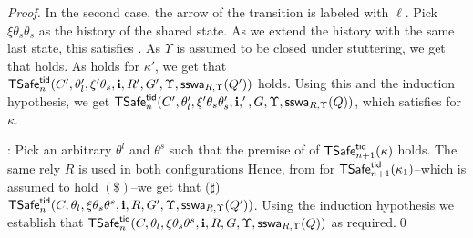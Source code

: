 \begin{proof}
In the second case, the arrow of the transition is labeled with $\ell$.
Pick $\xi\theta_s\theta_s$ as the history of the shared state.
As we extend the history with the same last state, this satisfies .
As $\Upsilon$ is assumed to be closed under stuttering, we get that
 holds.
As  holds for $\kappa'$, we get that 
$\safe_n(C',\theta'_l,\xi'\theta_s,\intp,R',G',\Upsilon,\sswa{Q'}{R}{\Upsilon})$ holds.
Using this and the induction hypothesis, we get
$\safe_n(C',\theta'_l,\xi'\theta_s\theta_s',\intp,',G,\Upsilon,\sswa{Q}{R}{\Upsilon})$,
which satisfies   for $\kappa$.


%

: 
Pick an arbitrary $\theta^l$ and $\theta^{s}$ such that the 
premise of  of $\safe_{n+1}(\kappa)$ holds. 
The same rely $R$ is used in both configurations 
Hence, %
from  for $\safe_{n+1}(\kappa_1)$--which is assumed to 
hold $(\$)$--we get that ($\sharp$)
$\safe_n(C,\theta_l,\xi\theta_s\theta^{s},\intp,R,G',\Upsilon, \sswa{Q'}{R}{\Upsilon})$.
Using the induction hypothesis 
we establish that 
$\safe_n(C,\theta_l,\xi\theta_s\theta^{s},\intp,R,G,\Upsilon, \sswa{Q}{R}{\Upsilon})$
as required.\qed
\end{proof}




